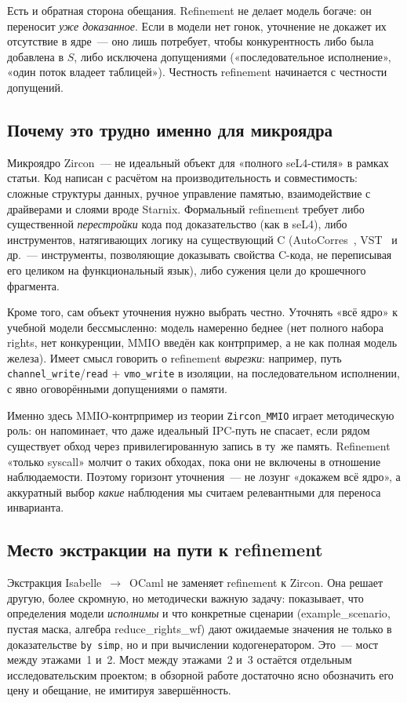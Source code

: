 \documentclass[11pt,a4paper]{article}
\newcommand{\isabel}[1]{{\isabelleit #1}}
\newcommand{\lemmaname}[1]{\isabel{#1}}
\begin{document}
Есть и обратная сторона обещания. Refinement не делает модель богаче:
он переносит \emph{уже доказанное}. Если в модели нет гонок, уточнение
не докажет их отсутствие в ядре~--- оно лишь потребует, чтобы
конкурентность либо была добавлена в $S$, либо исключена допущениями
(«последовательное исполнение», «один поток владеет таблицей»). Честность
refinement начинается с честности допущений.

\subsection{Почему это трудно именно для микроядра}

Микроядро Zircon~--- не идеальный объект для «полного seL4-стиля» в рамках
статьи. Код написан с расчётом на производительность и совместимость:
сложные структуры данных, ручное управление памятью, взаимодействие с
драйверами и слоями вроде Starnix. Формальный refinement требует либо
существенной \emph{перестройки} кода под доказательство (как в seL4), либо
инструментов, натягивающих логику на существующий C
(AutoCorres~\cite{autocorres}, VST~\cite{vst} и др.~--- инструменты,
позволяющие доказывать свойства C-кода, не переписывая его целиком на
функциональный язык), либо сужения цели до крошечного фрагмента.

Кроме того, сам объект уточнения нужно выбрать честно. Уточнять «всё
ядро» к учебной модели бессмысленно: модель намеренно беднее
(нет полного набора rights, нет конкуренции, MMIO введён как
контрпример, а не как полная модель железа). Имеет смысл говорить о
refinement \emph{вырезки}: например, путь
\texttt{channel\_write}/\texttt{read} + \texttt{vmo\_write} в изоляции,
на последовательном исполнении, с явно оговорёнными допущениями о памяти.

Именно здесь MMIO-контрпример из теории \texttt{Zircon\_MMIO} играет
методическую роль: он напоминает, что даже идеальный IPC-путь не спасает,
если рядом существует обход через привилегированную запись в ту~же
память. Refinement «только syscall» молчит о таких обходах, пока они не
включены в отношение наблюдаемости. Поэтому горизонт уточнения~--- не
лозунг «докажем всё ядро», а аккуратный выбор \emph{какие} наблюдения
мы считаем релевантными для переноса инварианта.

\subsection{Место экстракции на пути к refinement}

Экстракция Isabelle~$\to$~OCaml не заменяет refinement к Zircon. Она решает
другую, более скромную, но методически важную задачу: показывает, что
определения модели \emph{исполнимы} и что конкретные сценарии
(\lemmaname{example\_scenario}, пустая маска, алгебра
\lemmaname{reduce\_rights\_wf}) дают ожидаемые значения не только в
доказательстве \texttt{by~simp}, но и при вычислении кодогенератором.
Это~--- мост между этажами~1 и~2. Мост между этажами~2 и~3 остаётся
отдельным исследовательским проектом; в обзорной работе достаточно ясно
обозначить его цену и обещание, не имитируя завершённость.
\end{document}
